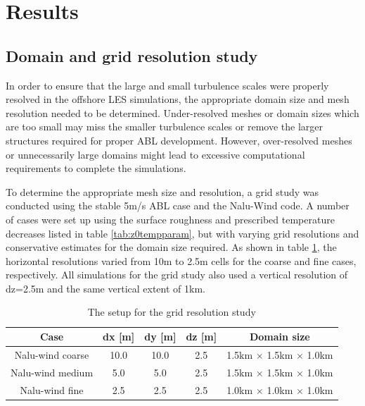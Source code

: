 \section{Results}

\subsection{\label{sec:gridstudy}Domain and grid resolution study}

In order to ensure that the large and small turbulence scales were
properly resolved in the offshore LES simulations, the appropriate
domain size and mesh resolution needed to be determined.
Under-resolved meshes or domain sizes which are too small may miss the
smaller turbulence scales or remove the larger structures required for
proper ABL development.  However, over-resolved meshes or
unnecessarily large domains might lead to excessive computational
requirements to complete the simulations.

To determine the appropriate mesh size and resolution, a grid study
was conducted using the stable 5m/s ABL case and the Nalu-Wind code.
A number of cases were set up using the surface roughness and
prescribed temperature decreases listed in table
\ref{tab:z0tempparam}, but with varying grid resolutions and
conservative estimates for the domain size required.  As shown in
table \ref{tab:GridStudySetup}, the horizontal resolutions varied from
10m to 2.5m cells for the coarse and fine cases, respectively.  All
simulations for the grid study also used a vertical resolution of
dz=2.5m and the same vertical extent of 1km.

\begin{table}
\caption{\label{tab:GridStudySetup} The setup for the grid resolution study} \centering
\begin{tabular}{ccccc}
  \hline
  Case              & dx [m] & dy [m] & dz [m] & Domain size \\
  \hline
  Nalu-wind coarse  &  10.0  & 10.0   & 2.5 & 1.5km $\times$ 1.5km $\times$ 1.0km  \\
  Nalu-wind medium  &   5.0  &  5.0   & 2.5 & 1.5km $\times$ 1.5km $\times$ 1.0km  \\
  Nalu-wind fine    &   2.5  &  2.5   & 2.5 & 1.0km $\times$ 1.0km $\times$ 1.0km  \\
\hline
\end{tabular}
\end{table}

